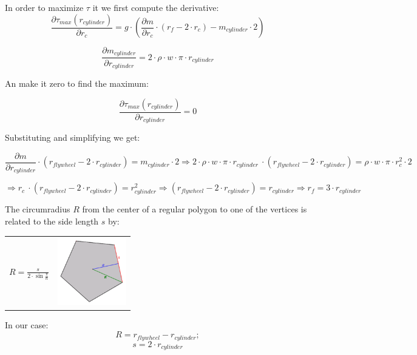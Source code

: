 In order to maximize $\tau$ it we first compute the derivative:
\[\frac{\partial \tau _{max} (r_{cylinder})}{\partial r_c} = g \cdot(\frac{\partial m}{\partial r_c} \cdot (r_f - 2 \cdot r_c) -  m_{cylinder} \cdot 2)\]

\[ \frac{\partial  m_{cylinder}}{\partial r_{cylinder}} = 2 \cdot \rho \cdot w \cdot \pi \cdot  r_{cylinder}\]

An make it zero to find the maximum:

\[\frac{\partial \tau _{max} (r_{cylinder})}{\partial r_{cylinder}} = 0\]

Substituting and simplifying we get:

\[\frac{\partial m}{\partial r_{cylinder}} \cdot (r_{flywheel} - 2 \cdot r_{cylinder}) = 
m_{cylinder} \cdot 2 \Rightarrow 2 \cdot \rho \cdot w \cdot \pi \cdot  r_{cylinder}\ \cdot (r_{flywheel} - 2 \cdot r_{cylinder}) = \rho \cdot w \cdot \pi \cdot r_c^2 \cdot 2 \]

\[ \Rightarrow r_c\ \cdot (r_{flywheel} - 2 \cdot r_{cylinder}) =  r_{cylinder}^2 
\Rightarrow (r_{flywheel} - 2 \cdot r_{cylinder}) =  r_{cylinder} 
\Rightarrow \boxed{r_f = 3 \cdot r_{cylinder}}\]


The circumradius $R$ from the center of a regular polygon to one of the vertices is related to the side length $s$ by:

\begin{center}
	\begin{tabular}{ c  c }
		\(\displaystyle R=\frac {s}{2\cdot \sin{\frac {\pi} {n}}} \)
		& 
		\includegraphics[width=3cm]{img/PolygonParameters.png}
	\end{tabular}
\end{center}

In our case:
\[ R = r_{flywheel} - r_{cylinder}; \]
\[ s = 2 \cdot r_{cylinder}\]


